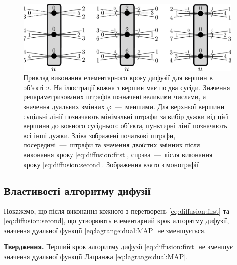 \begin{figure}[h]
  \centering
  \includegraphics[width=\textwidth]{images/diffusion_step}
  \caption{Приклад виконання елементарного кроку дифузії для вершин в об'єкті $u$.
           На ілюстрації кожна з вершин має по два сусіди.
           Значення репараметризованих штрафів позначені великими числами,
           а значення дуальних змінних $\varphi$~---~меншими.
           Для верхньої вершини суцільні лінії позначають мінімальні штрафи
           за вибір дужки від цієї вершини до кожного сусіднього об'єкта,
           пунктирні лінії позначають всі інші дужки.
           Зліва зображені початкові штрафи,
           посередині~---~штрафи та значення
           двоїстих змінних після виконання кроку \eqref{eq:diffusion:first},
           справа~---~після виконання кроку \eqref{eq:diffusion:second}.
           Зображення взято з монографії \cite{overview:savchynskyy:diffusion}}
  \label{fig:diffusion:step}
\end{figure}

\subsection{Властивості алгоритму дифузії}

Покажемо, що після виконання кожного з перетворень \eqref{eq:diffusion:first}
та \eqref{eq:diffusion:second},
що утворюють елементарний крок алгоритму дифузії,
значення дуальної функції \eqref{eq:lagrange:dual:MAP} не зменшується.

\textbf{Твердження.}
Перший крок алгоритму дифузії \eqref{eq:diffusion:first}
не зменшує значення дуальної функції Лагранжа \eqref{eq:lagrange:dual:MAP}.

